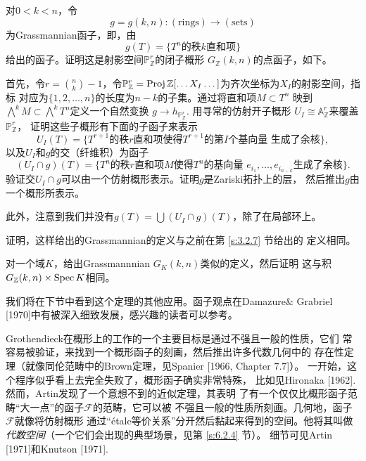 \begin{exe}\label{exe:6.18}
对$0<k<n$，令
\[
g=g(k,n):(\text{rings})\to (\text{sets})    
\]
为Grassmannian函子，即，由
\[
    g(T)=\{\text{$T^n$的秩$k$直和项}\}
\]
给出的函子。证明这是射影空间$\mathbb P_{\mathbb Z}^r$的闭子概形
$G_{\mathbb Z}(k,n)$的点函子，如下。

首先，令$r= {n \choose k}-1$，令$\mathbb P_{\mathbb Z}^r
=\operatorname{Proj} \mathbb Z[\dots X_I \dots]$为齐次坐标为$X_I$的射影空间，指标
对应为$\{1,2,\dots,n\}$的长度为$n-k$的子集。通过将直和项$M\subset T^n$
映到$\bigwedge^k M\subset \bigwedge^k T^n$定义一个自然变换
$g\to h_{\mathbb P_{\mathbb Z}^r}$. 用寻常的仿射开子概形
$U_I\cong \mathbb A_{\mathbb Z}^r$来覆盖$\mathbb P_{\mathbb Z}^r$，
证明这些子概形有下面的子函子来表示
\[
    U_I(T)=\{\text{$T^{r+1}$的秩$r$直和项使得$T^{r+1}$的第$I$个基向量
    生成了余核}\},
\]
以及$U_I$和$g$的交（纤维积）为函子
\[
    (U_I\cap g)(T)=\{\text{$T^{n}$的秩$r$直和项$M$使得$T^{n}$的基向量
    $e_{i_1},\dots,e_{i_{n-k}}$生成了余核}\}.
\]
验证交$U_I\cap g$可以由一个仿射概形表示。证明$g$是Zariski拓扑上的层，
然后推出$g$由一个概形所表示。
\end{exe}

此外，注意到我们并没有$g(T)=\bigcup (U_I\cap g)(T)$，除了在局部环上。

\begin{exe}\label{exe:6.19}
证明，这样给出的Grassmannian的定义与之前在第 \ref{s:3.2.7} 节给出的
定义相同。
\end{exe}

\begin{exe}\label{exe:6.20}
    对一个域$K$，给出Grassmannnian $G_K(k,n)$类似的定义，然后证明
    这与积$G_{\mathbb Z}(k,n)\times \operatorname{Spec} K$相同。
\end{exe}

我们将在下节中看到这个定理的其他应用。函子观点在Damazure\& Grabriel
[1970]中有被深入细致发展，感兴趣的读者可以参考。

Grothendieck在概形上的工作的一个主要目标是通过不强且一般的性质，它们
常容易被验证，来找到一个概形函子的刻画，然后推出许多代数几何中的
存在性定理（就像同伦范畴中的Brown定理，见Spanier [1966, Chapter 7.7]）。
一开始，这个程序似乎看上去完全失败了，概形函子确实非常特殊，
比如见Hironaka [1962]. 然而，Artin发现了一个意想不到的近似定理，其表明%
了有一个仅仅比概形函子范畴“大一点”的函子$\mathscr F$的范畴，它可以被
不强且一般的性质所刻画。几何地，函子$\mathscr F$就像将仿射概形
通过“\'etale等价关系”分开然后黏起来得到的空间。他将其叫做
\emph{代数空间}（一个它们会出现的典型场景，见第 \ref{s:6.2.4} 节）。
细节可见Artin [1971]和Knutson [1971].

